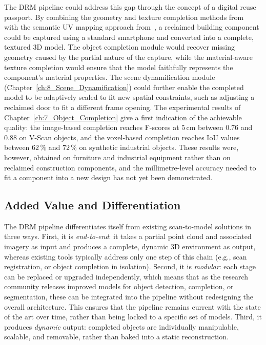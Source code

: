 The DRM pipeline could address this gap through the concept of a digital reuse passport. By combining the geometry and texture completion methods from~\cite{vermandere_geometry_2025} with the semantic UV mapping approach from~\cite{vermandere_semantic_2024}, a reclaimed building component could be captured using a standard smartphone and converted into a complete, textured 3D model. The object completion module would recover missing geometry caused by the partial nature of the capture, while the material-aware texture completion would ensure that the model faithfully represents the component's material properties. The scene dynamification module (Chapter~\ref{ch:8_Scene_Dynamification}) could further enable the completed model to be adaptively scaled to fit new spatial constraints, such as adjusting a reclaimed door to fit a different frame opening. The experimental results of Chapter~\ref{ch:7_Object_Completion} give a first indication of the achievable quality: the image-based completion reaches F-scores at $5$\,cm between $0.76$ and $0.88$ on V-Scan objects, and the voxel-based completion reaches IoU values between $62\,\%$ and $72\,\%$ on synthetic industrial objects. These results were, however, obtained on furniture and industrial equipment rather than on reclaimed construction components, and the millimetre-level accuracy needed to fit a component into a new design has not yet been demonstrated.


\subsection{Added Value and Differentiation}
\label{sec:val_added_value}

The DRM pipeline differentiates itself from existing scan-to-model solutions in three ways. First, it is \textit{end-to-end}: it takes a partial point cloud and associated imagery as input and produces a complete, dynamic 3D environment as output, whereas existing tools typically address only one step of this chain (e.g., scan registration, or object completion in isolation). Second, it is \textit{modular}: each stage can be replaced or upgraded independently, which means that as the research community releases improved models for object detection, completion, or segmentation, these can be integrated into the pipeline without redesigning the overall architecture. This ensures that the pipeline remains current with the state of the art over time, rather than being locked to a specific set of models. Third, it produces \textit{dynamic} output: completed objects are individually manipulable, scalable, and removable, rather than baked into a static reconstruction.

